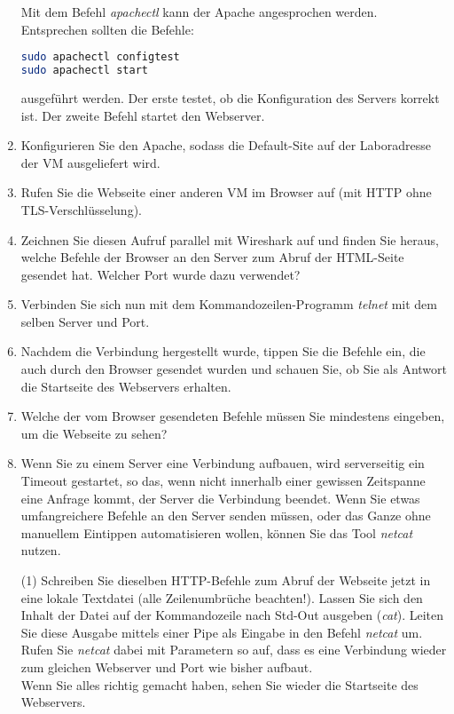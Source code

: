 \documentclass[paper=a4,fontsize=11pt]{scrartcl}%
\numberwithin{equation}{section}
\begin{document}
\begin{enumerate}
Mit dem Befehl \emph{apachectl} kann der Apache angesprochen werden. Entsprechen sollten die Befehle:
	\begin{lstlisting}[style=Bash, language=Bash]
sudo apachectl configtest
sudo apachectl start
\end{lstlisting}
	ausgeführt werden. Der erste testet, ob die Konfiguration des Servers korrekt ist. Der zweite Befehl startet den Webserver.
	\item Konfigurieren Sie den Apache, sodass die Default-Site auf der Laboradresse der VM ausgeliefert wird.
	\item Rufen Sie die Webseite einer anderen VM im Browser auf (mit HTTP ohne TLS-Verschlüsselung).
	\item Zeichnen Sie diesen Aufruf parallel mit Wireshark auf und finden Sie heraus, welche Befehle der Browser an den Server zum  Abruf der HTML-Seite gesendet hat. Welcher Port wurde dazu verwendet?
	\item Verbinden Sie sich nun mit dem Kommandozeilen-Programm \emph{telnet} mit dem selben Server und Port.
	\item Nachdem die Verbindung hergestellt wurde, tippen Sie die Befehle ein, die auch durch den Browser gesendet wurden und schauen Sie, ob Sie als Antwort die Startseite des Webservers erhalten.
	\item Welche der vom Browser gesendeten Befehle müssen Sie mindestens eingeben, um die Webseite zu sehen?
	\item Wenn Sie zu einem Server eine Verbindung aufbauen, wird serverseitig ein Timeout gestartet, so das, wenn nicht innerhalb einer gewissen Zeitspanne eine Anfrage kommt, der Server die Verbindung beendet. Wenn Sie etwas umfangreichere Befehle an den Server senden müssen, oder das Ganze ohne manuellem Eintippen automatisieren wollen, können Sie das Tool \emph{netcat} nutzen.
	\begin{tasks}(1)
		\task Schreiben Sie dieselben HTTP-Befehle zum Abruf der Webseite jetzt in eine lokale Textdatei (alle Zeilenumbrüche beachten!).
		\task Lassen Sie sich den Inhalt der Datei auf der Kommandozeile nach Std-Out ausgeben (\emph{cat}).
		\task Leiten Sie diese Ausgabe mittels einer Pipe als Eingabe in den Befehl \emph{netcat} um. Rufen Sie \emph{netcat} dabei mit  Parametern so auf, dass es eine Verbindung wieder zum gleichen Webserver und Port wie bisher aufbaut.\\
 Wenn Sie alles richtig gemacht haben, sehen Sie wieder die Startseite des Webservers.
	\end{tasks}

\end{enumerate}
\end{document}
